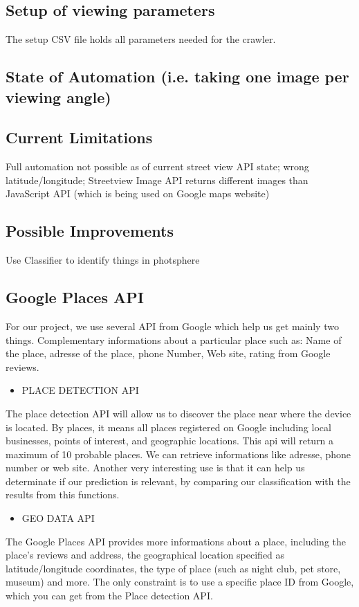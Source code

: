 \subsection{Setup of viewing parameters}\label{csv_file}
The setup CSV file holds all parameters needed for the crawler.

\subsection{State of Automation (i.e. taking one image per viewing angle)}

\subsection{Current Limitations}
Full automation not possible as of current street view API state; wrong latitude/longitude; Streetview Image API returns different images than JavaScript API (which is being used on Google maps website)

\subsection{Possible Improvements}
Use Classifier to identify things in photsphere

\subsection{Google Places API}
For our project, we use several API from Google which help us get mainly two things. Complementary informations about a particular place such as: Name of the place, adresse of the place, phone Number, Web site, rating from Google reviews.
\begin{itemize}
    \item {PLACE DETECTION API}
\end{itemize}
The place detection API will allow us to discover the place near where the device is located. By places, it means all places registered on Google including local businesses, points of interest, and geographic locations. This api will return a maximum of 10 probable places. We can retrieve informations like adresse, phone number or web site.
Another very interesting use is that it can help us determinate if our prediction is relevant, by comparing our classification with the results from this functions.

\begin{itemize}
    \item {GEO DATA API}
\end{itemize}
The Google Places API provides more informations about a place, including the place's reviews and address, the geographical location specified as latitude/longitude coordinates, the type of place (such as night club, pet store, museum) and more. The only constraint is to use a specific place ID from Google, which you can get from the Place detection API.

